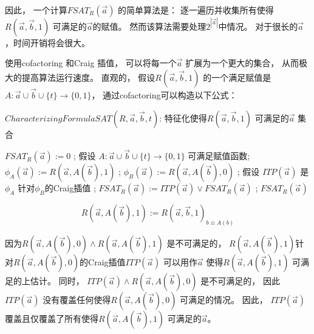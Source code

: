 因此，
一个计算$FSAT_R(\vec{a})$ 的简单算法是：
逐一遍历并收集所有使得$R(\vec{a},\vec{b},1)$ 可满足的$\vec{a}$的赋值。
然而该算法需要处理$2^{|\vec{a}|}$中情况。
对于很长的$\vec{a}$，时间开销将会很大。

使用cofactoring  和Craig 插值，
可以将每一个$\vec{a}$ 扩展为一个更大的集合，
从而极大的提高算法运行速度。
直观的，
假设$R(\vec{a},\vec{b},1)$ 的一个满足赋值是$A:\vec{a}\cup\vec{b}\cup\{t\}\to\{0,1\}$，
通过cofactoring可以构造以下公式：

\begin{algorithm}[t]
\caption{$CharacterizingFormulaSAT(R,\vec{a},\vec{b},t)$: 特征化使得$R(\vec{a},\vec{b},1)$ 可满足的$\vec{a}$ 集合}
\label{alg_craigchar}
\begin{algorithmic}[1]
\label{initcondition}
\STATE $FSAT_R(\vec{a}):= 0$ ;
\label{testsat}
  \STATE 假设 $A:\vec{a}\cup\vec{b}\cup\{t\}\rightarrow \{0,1\}$ 可满足赋值函数;
  \STATE $\phi_A(\vec{a}):= R(\vec{a},A(\vec{b}),1)$ ;
\label{cofact1}
  \STATE $\phi_B(\vec{a}):= R(\vec{a},A(\vec{b}),0)$ ;
\label{cofact2}
  \STATE 假设 $ITP(\vec{a})$ 是$\phi_A$ 针对$\phi_B$的Craig插值 ;
\label{ab}
  \STATE $FSAT_R(\vec{a}):= ITP(\vec{a}) \vee FSAT_R(\vec{a})$ ;
\label{add}
\ENDWHILE
\RETURN $FSAT_R(\vec{a})$
\end{algorithmic}
\end{algorithm}

\begin{equation}
R(\vec{a},A(\vec{b}),1):=R(\vec{a},\vec{b},1)_{b\equiv A(b)}
\end{equation}

因为$R(\vec{a},A(\vec{b}),0)\wedge R(\vec{a},A(\vec{b}),1)$ 是不可满足的，
$R(\vec{a},A(\vec{b}),1)$针对$R(\vec{a},A(\vec{b}),0)$的Craig插值$ITP(\vec{a})$ 可以用作$\vec{a}$ 使得$R(\vec{a},A(\vec{b}),1)$ 可满足的上估计。
同时，
$ITP(\vec{a})\wedge R(\vec{a},A(\vec{b}),0)$ 是不可满足的，
因此$ITP(\vec{a})$ 没有覆盖任何使得$R(\vec{a},A(\vec{b}),0)$ 可满足的情况。
因此，
$ITP(\vec{a})$ 覆盖且仅覆盖了所有使得$R(\vec{a},A(\vec{b}),1)$ 可满足的$\vec{a}$。


